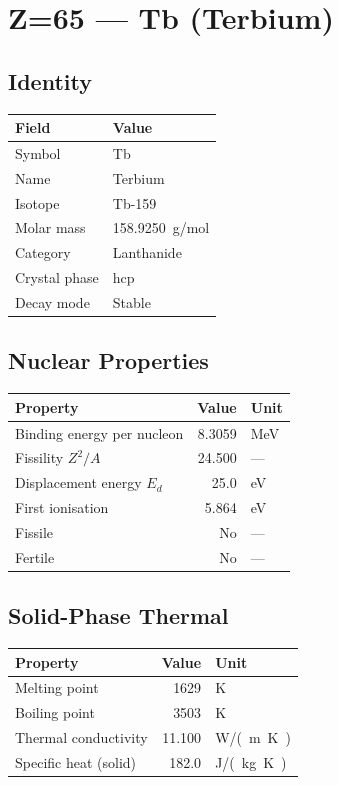 \documentclass[11pt,a4paper]{article}
\begin{document}
\newpage

\section{Z=65 --- Tb (Terbium)}
\label{sec:Z65}

\subsection{Identity}
\begin{tabular}{ll}
  \toprule
  Field & Value \\
  \midrule
  Symbol & Tb \\
  Name & Terbium \\
  Isotope & Tb-159 \\
  Molar mass & \SI{158.9250}{g/mol} \\
  Category & Lanthanide \\
  Crystal phase & hcp \\
  Decay mode & Stable \\
  \bottomrule
\end{tabular}

\subsection{Nuclear Properties}
\begin{tabular}{lrl}
  \toprule
  Property & Value & Unit \\
  \midrule
  Binding energy per nucleon & 8.3059 & \si{MeV} \\
  Fissility $Z^2/A$ & 24.500 & --- \\
  Displacement energy $E_d$ & 25.0 & \si{eV} \\
  First ionisation & 5.864 & \si{eV} \\
  Fissile & No & --- \\
  Fertile & No & --- \\
  \bottomrule
\end{tabular}

\subsection{Solid-Phase Thermal}
\begin{tabular}{lrl}
  \toprule
  Property & Value & Unit \\
  \midrule
  Melting point & 1629 & \si{K} \\
  Boiling point & 3503 & \si{K} \\
  Thermal conductivity & 11.100 & \si{W/(m.K)} \\
  Specific heat (solid) & 182.0 & \si{J/(kg.K)} \\
  \bottomrule
\end{tabular}
\end{document}
